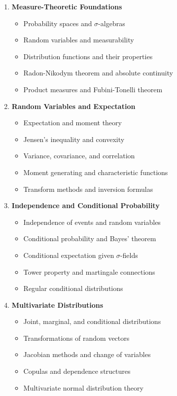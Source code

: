 \documentclass[12pt,a4paper]{article}
\theoremstyle{remark}
\begin{document}
\begin{enumerate}
\item \textbf{Measure-Theoretic Foundations}
   \begin{itemize}
   \item Probability spaces and $\sigma$-algebras
   \item Random variables and measurability
   \item Distribution functions and their properties
   \item Radon-Nikodym theorem and absolute continuity
   \item Product measures and Fubini-Tonelli theorem
   \end{itemize}

\item \textbf{Random Variables and Expectation}
   \begin{itemize}
   \item Expectation and moment theory
   \item Jensen's inequality and convexity
   \item Variance, covariance, and correlation
   \item Moment generating and characteristic functions
   \item Transform methods and inversion formulas
   \end{itemize}

\item \textbf{Independence and Conditional Probability}
   \begin{itemize}
   \item Independence of events and random variables
   \item Conditional probability and Bayes' theorem
   \item Conditional expectation given $\sigma$-fields
   \item Tower property and martingale connections
   \item Regular conditional distributions
   \end{itemize}

\item \textbf{Multivariate Distributions}
   \begin{itemize}
   \item Joint, marginal, and conditional distributions
   \item Transformations of random vectors
   \item Jacobian methods and change of variables
   \item Copulas and dependence structures
   \item Multivariate normal distribution theory
   \end{itemize}


\end{enumerate}
\end{document}
